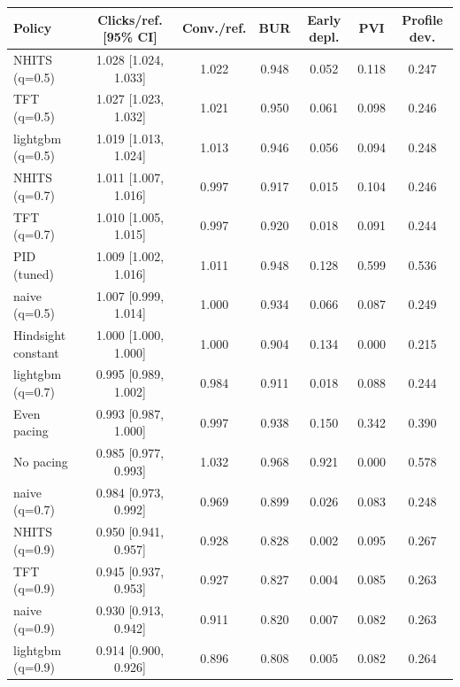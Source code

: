 \begin{tabular}{lcccccc}
\toprule
Policy & Clicks/ref. [95\% CI] & Conv./ref. & BUR & Early depl. & PVI & Profile dev. \\
\midrule
NHITS (q=0.5) & 1.028 [1.024, 1.033] & 1.022 & 0.948 & 0.052 & 0.118 & 0.247 \\
TFT (q=0.5) & 1.027 [1.023, 1.032] & 1.021 & 0.950 & 0.061 & 0.098 & 0.246 \\
lightgbm (q=0.5) & 1.019 [1.013, 1.024] & 1.013 & 0.946 & 0.056 & 0.094 & 0.248 \\
NHITS (q=0.7) & 1.011 [1.007, 1.016] & 0.997 & 0.917 & 0.015 & 0.104 & 0.246 \\
TFT (q=0.7) & 1.010 [1.005, 1.015] & 0.997 & 0.920 & 0.018 & 0.091 & 0.244 \\
PID (tuned) & 1.009 [1.002, 1.016] & 1.011 & 0.948 & 0.128 & 0.599 & 0.536 \\
naive (q=0.5) & 1.007 [0.999, 1.014] & 1.000 & 0.934 & 0.066 & 0.087 & 0.249 \\
Hindsight constant & 1.000 [1.000, 1.000] & 1.000 & 0.904 & 0.134 & 0.000 & 0.215 \\
lightgbm (q=0.7) & 0.995 [0.989, 1.002] & 0.984 & 0.911 & 0.018 & 0.088 & 0.244 \\
Even pacing & 0.993 [0.987, 1.000] & 0.997 & 0.938 & 0.150 & 0.342 & 0.390 \\
No pacing & 0.985 [0.977, 0.993] & 1.032 & 0.968 & 0.921 & 0.000 & 0.578 \\
naive (q=0.7) & 0.984 [0.973, 0.992] & 0.969 & 0.899 & 0.026 & 0.083 & 0.248 \\
NHITS (q=0.9) & 0.950 [0.941, 0.957] & 0.928 & 0.828 & 0.002 & 0.095 & 0.267 \\
TFT (q=0.9) & 0.945 [0.937, 0.953] & 0.927 & 0.827 & 0.004 & 0.085 & 0.263 \\
naive (q=0.9) & 0.930 [0.913, 0.942] & 0.911 & 0.820 & 0.007 & 0.082 & 0.263 \\
lightgbm (q=0.9) & 0.914 [0.900, 0.926] & 0.896 & 0.808 & 0.005 & 0.082 & 0.264 \\
\bottomrule
\end{tabular}
